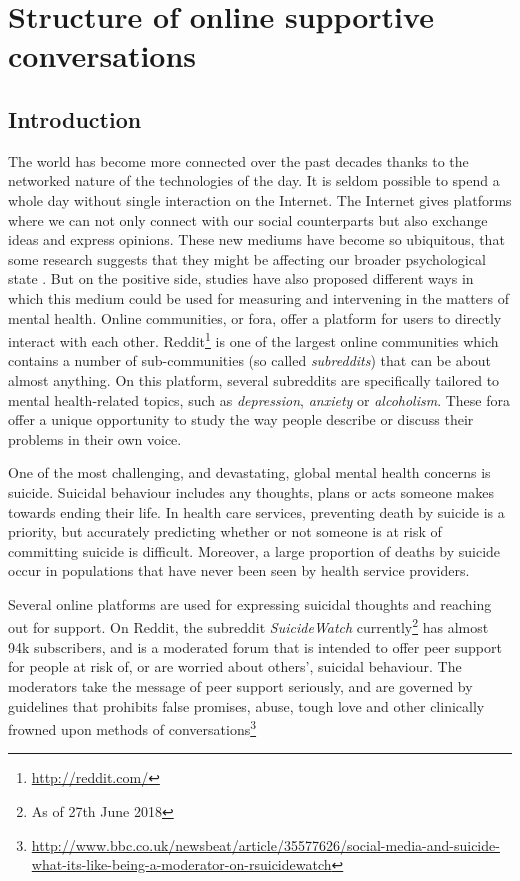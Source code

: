\chapter{Structure of online supportive conversations}


\graphicspath{{Chapter3/plots/}}

\section{Introduction}

The world has become more connected over the past decades thanks to the networked nature of the technologies of the day. It is seldom possible to spend a whole day without single interaction on the Internet. The Internet gives platforms where we can not only connect with our social counterparts but also exchange ideas and express opinions. These new mediums have become so ubiquitous, that some research suggests that they might be affecting our broader psychological state \cite{d20122}. But on the positive side, studies have also proposed different ways in which this medium could be used for measuring and intervening in the matters of mental health\cite{DeChoudhury2016,DeChoudhury2014}.
Online communities, or fora, offer a platform for users to directly interact with each other. Reddit\footnote{\url{http://reddit.com/}} is one of the largest online communities which contains a number of sub-communities (so called \emph{subreddits}) that can be about almost anything. On this platform, several subreddits are specifically tailored to mental health-related topics, such as \emph{depression}, \emph{anxiety} or \emph{alcoholism}. These fora offer a unique opportunity to study the way people describe or discuss their problems in their own voice.

One of the most challenging, and devastating, global mental health concerns is suicide. Suicidal behaviour includes any thoughts, plans or acts someone makes towards ending their life. In health care services, preventing death by suicide is a priority, but accurately predicting whether or not someone is at risk of committing suicide is difficult. Moreover, a large proportion of deaths by suicide occur in populations that have never been seen by health service providers.

Several online platforms are used for expressing suicidal thoughts and reaching out for support. On Reddit, the subreddit \emph{SuicideWatch} currently\footnote{As of 27th June 2018} has almost 94k subscribers, and is a moderated forum that is intended to offer peer support for people at risk of, or are worried about others', suicidal behaviour. The moderators take the message of peer support seriously, and are governed by guidelines that prohibits false promises, abuse, tough love and other clinically frowned upon methods of conversations\footnote{\url{http://www.bbc.co.uk/newsbeat/article/35577626/social-media-and-suicide-what-its-like-being-a-moderator-on-rsuicidewatch} }


